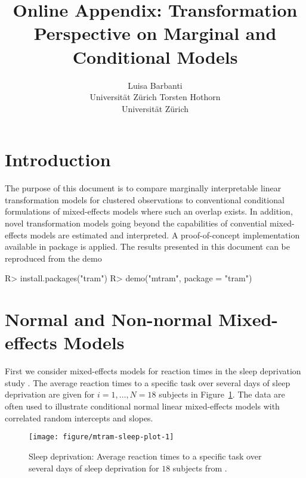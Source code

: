 \documentclass[article,nojss,shortnames]{jss}\usepackage[]{graphicx}\usepackage[]{xcolor}
\author{Luisa Barbanti \\ Universit\"at Z\"urich \And Torsten Hothorn \\ Universit\"at Z\"urich}
\title{Online Appendix: Transformation Perspective on Marginal and Conditional Models}
\begin{document}
% 







\section{Introduction}

The purpose of this document is to compare marginally interpretable linear
transformation models for clustered observations
\citep{Hothorn_2019_mtram} to conventional conditional
formulations of mixed-effects models where such an overlap exists.  In
addition, novel transformation models going beyond the capabilities of
convential mixed-effects models are estimated and interpreted.  A
proof-of-concept implementation available in package
 \citep{pkg:tram} is applied. 
The results presented in this
document can be reproduced from the  demo
\begin{Schunk}
\begin{Sinput}
R> install.packages("tram")
R> demo("mtram", package = "tram")
\end{Sinput}
\end{Schunk}

\section{Normal and Non-normal Mixed-effects Models}

First we consider mixed-effects models for reaction times in the sleep
deprivation study \citep{Belenky_Wesensten_Thorne_2003}.  The average
reaction times to a specific task over several days of sleep deprivation are
given for $i = 1, \dots, N = 18$ subjects in Figure~\ref{fig:sleepstudy}.
The data are often used to illustrate
conditional normal linear mixed-effects models with correlated random
intercepts and slopes. %

\begin{figure}[t]
\begin{Schunk}


{\centering \texttt{[image: figure/mtram-sleep-plot-1]} 

}

\end{Schunk}
\caption{Sleep deprivation: Average reaction times to a specific task over several days 
         of sleep deprivation for $18$ subjects from
         \cite{Belenky_Wesensten_Thorne_2003}. \label{fig:sleepstudy}}
\end{figure}
\end{document}
